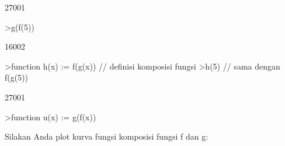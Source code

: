 \documentclass[a4paper,10pt]{article}
\begin{document}
\begin{eulernotebook}
\begin{eulercomment}
\begin{eulercomment}
\begin{eulercomment}
\begin{eulercomment}
\begin{eulercomment}
\begin{eulercomment}
\begin{eulercomment}
\begin{eulercomment}
\begin{eulercomment}
\begin{eulercomment}
\begin{eulercomment}
\begin{eulercomment}
\begin{eulercomment}
\begin{eulercomment}
\begin{eulercomment}
\begin{eulercomment}
\begin{eulercomment}
\begin{eulercomment}
\begin{eulercomment}
\begin{eulercomment}
\begin{eulercomment}
\begin{eulercomment}
\begin{eulercomment}
\begin{eulercomment}
\begin{eulercomment}
\begin{eulercomment}
\begin{eulercomment}
\begin{eulercomment}
\begin{eulercomment}
\begin{eulercomment}
\begin{eulercomment}
\begin{eulercomment}
\begin{eulercomment}
\begin{eulercomment}
\begin{eulercomment}
\begin{eulercomment}
\begin{eulercomment}
\begin{eulercomment}
\begin{eulercomment}
\begin{eulercomment}
\begin{eulercomment}
\begin{eulercomment}
\begin{eulercomment}
\begin{eulercomment}
\begin{eulercomment}
\begin{eulercomment}
\begin{eulercomment}
\begin{eulercomment}
\begin{eulercomment}
\begin{eulercomment}
\begin{eulercomment}
\begin{eulercomment}
\begin{euleroutput}
  27001
\end{euleroutput}
\begin{eulerprompt}
>g(f(5))
\end{eulerprompt}
\begin{euleroutput}
  16002
\end{euleroutput}
\begin{eulerprompt}
>function h(x) := f(g(x)) // definisi komposisi fungsi
>h(5) // sama dengan f(g(5))
\end{eulerprompt}
\begin{euleroutput}
  27001
\end{euleroutput}
\begin{eulerprompt}
>function u(x) := g(f(x))
\end{eulerprompt}
\begin{eulercomment}
Silakan Anda plot kurva fungsi komposisi fungsi f dan g:


\end{eulercomment}
\end{eulercomment}
\end{eulercomment}
\end{eulercomment}
\end{eulercomment}
\end{eulercomment}
\end{eulercomment}
\end{eulercomment}
\end{eulercomment}
\end{eulercomment}
\end{eulercomment}
\end{eulercomment}
\end{eulercomment}
\end{eulercomment}
\end{eulercomment}
\end{eulercomment}
\end{eulercomment}
\end{eulercomment}
\end{eulercomment}
\end{eulercomment}
\end{eulercomment}
\end{eulercomment}
\end{eulercomment}
\end{eulercomment}
\end{eulercomment}
\end{eulercomment}
\end{eulercomment}
\end{eulercomment}
\end{eulercomment}
\end{eulercomment}
\end{eulercomment}
\end{eulercomment}
\end{eulercomment}
\end{eulercomment}
\end{eulercomment}
\end{eulercomment}
\end{eulercomment}
\end{eulercomment}
\end{eulercomment}
\end{eulercomment}
\end{eulercomment}
\end{eulercomment}
\end{eulercomment}
\end{eulercomment}
\end{eulercomment}
\end{eulercomment}
\end{eulercomment}
\end{eulercomment}
\end{eulercomment}
\end{eulercomment}
\end{eulercomment}
\end{eulercomment}
\end{eulercomment}
\end{eulernotebook}
\end{document}
